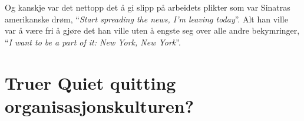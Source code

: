 \documentclass[a4paper, 12pt]{article}  %
\begin{document}
Og kanskje var det nettopp det å gi slipp på arbeidets plikter som var Sinatras amerikanske drøm, ``\emph{Start spreading the news, I'm leaving today}''. Alt han ville var å være fri å gjøre det han ville uten å engste seg over alle andre bekymringer, ``\emph{I want to be a part of it: New York, New York}''.

\newpage
\section{Truer Quiet quitting organisasjonskulturen?}

\newpage
\printbibliography[heading=bibintoc] %
\end{document}
